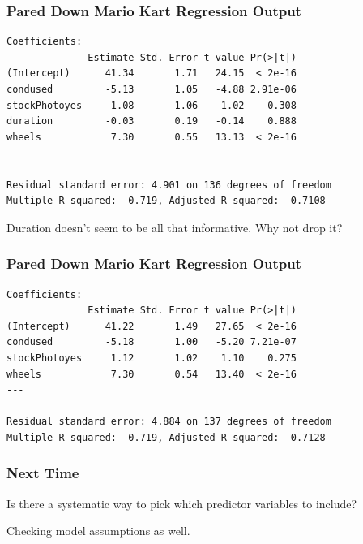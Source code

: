\documentclass[handout]{beamer}
\begin{document}
\begin{frame}[fragile]
\frametitle{Pared Down Mario Kart Regression Output}

\begin{small}
\begin{verbatim}
Coefficients:
              Estimate Std. Error t value Pr(>|t|)    
(Intercept)      41.34       1.71   24.15  < 2e-16
condused         -5.13       1.05   -4.88 2.91e-06
stockPhotoyes     1.08       1.06    1.02    0.308    
duration         -0.03       0.19   -0.14    0.888    
wheels            7.30       0.55   13.13  < 2e-16
---

Residual standard error: 4.901 on 136 degrees of freedom
Multiple R-squared:  0.719,	Adjusted R-squared:  0.7108 
\end{verbatim}
\end{small}

\pause Duration doesn't seem to be all that informative.  Why not drop it?

\end{frame}


\begin{frame}[fragile]
\frametitle{Pared Down Mario Kart Regression Output}

\begin{small}
\begin{verbatim}
Coefficients:
              Estimate Std. Error t value Pr(>|t|)    
(Intercept)      41.22       1.49   27.65  < 2e-16
condused         -5.18       1.00   -5.20 7.21e-07
stockPhotoyes     1.12       1.02    1.10    0.275    
wheels            7.30       0.54   13.40  < 2e-16
---

Residual standard error: 4.884 on 137 degrees of freedom
Multiple R-squared:  0.719,	Adjusted R-squared:  0.7128 
\end{verbatim}
\end{small}

\end{frame}


\begin{frame}[fragile]
\frametitle{Next Time}

Is there a systematic way to pick which predictor variables to include?

\pause\vspace{0.5cm}

Checking model assumptions as well.  

\end{frame}
\end{document}
